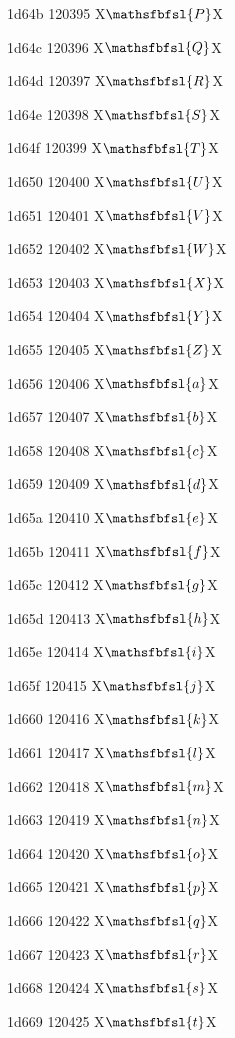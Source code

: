 \documentclass[11pt]{article}
\begin{document}
1d64b 120395 X{\ensuremath{\mathsfbfsl{P}}}X

1d64c 120396 X{\ensuremath{\mathsfbfsl{Q}}}X

1d64d 120397 X{\ensuremath{\mathsfbfsl{R}}}X

1d64e 120398 X{\ensuremath{\mathsfbfsl{S}}}X

1d64f 120399 X{\ensuremath{\mathsfbfsl{T}}}X

1d650 120400 X{\ensuremath{\mathsfbfsl{U}}}X

1d651 120401 X{\ensuremath{\mathsfbfsl{V}}}X

1d652 120402 X{\ensuremath{\mathsfbfsl{W}}}X

1d653 120403 X{\ensuremath{\mathsfbfsl{X}}}X

1d654 120404 X{\ensuremath{\mathsfbfsl{Y}}}X

1d655 120405 X{\ensuremath{\mathsfbfsl{Z}}}X

1d656 120406 X{\ensuremath{\mathsfbfsl{a}}}X

1d657 120407 X{\ensuremath{\mathsfbfsl{b}}}X

1d658 120408 X{\ensuremath{\mathsfbfsl{c}}}X

1d659 120409 X{\ensuremath{\mathsfbfsl{d}}}X

1d65a 120410 X{\ensuremath{\mathsfbfsl{e}}}X

1d65b 120411 X{\ensuremath{\mathsfbfsl{f}}}X

1d65c 120412 X{\ensuremath{\mathsfbfsl{g}}}X

1d65d 120413 X{\ensuremath{\mathsfbfsl{h}}}X

1d65e 120414 X{\ensuremath{\mathsfbfsl{i}}}X

1d65f 120415 X{\ensuremath{\mathsfbfsl{j}}}X

1d660 120416 X{\ensuremath{\mathsfbfsl{k}}}X

1d661 120417 X{\ensuremath{\mathsfbfsl{l}}}X

1d662 120418 X{\ensuremath{\mathsfbfsl{m}}}X

1d663 120419 X{\ensuremath{\mathsfbfsl{n}}}X

1d664 120420 X{\ensuremath{\mathsfbfsl{o}}}X

1d665 120421 X{\ensuremath{\mathsfbfsl{p}}}X

1d666 120422 X{\ensuremath{\mathsfbfsl{q}}}X

1d667 120423 X{\ensuremath{\mathsfbfsl{r}}}X

1d668 120424 X{\ensuremath{\mathsfbfsl{s}}}X

1d669 120425 X{\ensuremath{\mathsfbfsl{t}}}X
\end{document}

